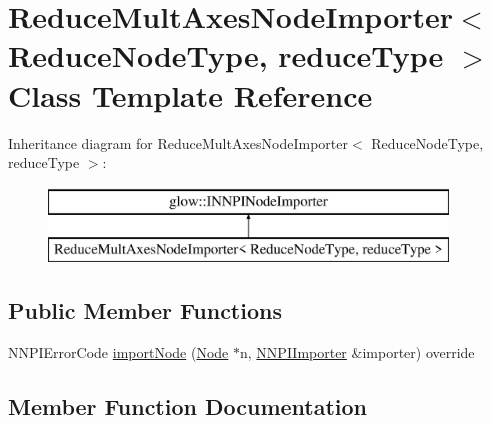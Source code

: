 \hypertarget{class_reduce_mult_axes_node_importer}{}\section{Reduce\+Mult\+Axes\+Node\+Importer$<$ Reduce\+Node\+Type, reduce\+Type $>$ Class Template Reference}
\label{class_reduce_mult_axes_node_importer}
Inheritance diagram for Reduce\+Mult\+Axes\+Node\+Importer$<$ Reduce\+Node\+Type, reduce\+Type $>$\+:\begin{figure}[H]
\begin{center}
\leavevmode
\includegraphics[height=2.000000cm]{class_reduce_mult_axes_node_importer}
\end{center}
\end{figure}
\subsection*{Public Member Functions}
\begin{DoxyCompactItemize}
\item 
N\+N\+P\+I\+Error\+Code \hyperlink{class_reduce_mult_axes_node_importer_ab29453a12dacd55b255660226941af5f}{import\+Node} (\hyperlink{classglow_1_1_node}{Node} $\ast$n, \hyperlink{classglow_1_1_n_n_p_i_importer}{N\+N\+P\+I\+Importer} \&importer) override
\end{DoxyCompactItemize}


\subsection{Member Function Documentation}
\mbox{\label{class_reduce_mult_axes_node_importer_ab29453a12dacd55b255660226941af5f}} 
